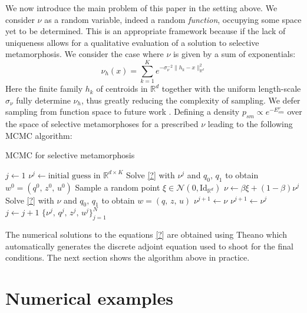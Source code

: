 \documentclass[runningheads]{llncs}
\newcommand{\Rd}{\mathbb{R}^{d}}
\newcommand{\RdK}{\mathbb{R}^{d\times K}}
\begin{document}
We now introduce the main problem of this paper in the setting above. We
consider $\nu$ as a random variable, indeed a random \emph{function}, occupying
some space yet to be determined. This is an appropriate framework because if the
lack of uniqueness allows for a qualitative evaluation of a solution to
selective metamorphosis. We consider the case where $\nu$ is given by a sum of
exponentials:
\begin{equation}
    \nu_h (x) = \sum_{k=1}^K e^{ -\sigma_\nu^{-2}\|h_k - x\|_{\Rd}^2}
\end{equation}
Here the finite family $h_k$ of centroids in $\Rd$ together with the uniform
length-scale $\sigma_\nu$ fully determine $\nu_h$, thus greatly reducing the
complexity of sampling. We defer sampling from function space to future work
\cite{.}. Defining a density $p_{sm} \propto e^{- E_{sm}^\nu}$ over the space of
selective metamorphoses for a prescribed $\nu$ leading to the following MCMC
algorithm:

\newcommand{\mhsample}{\textsc{sampleCentroid}}
\newcommand{\acceptprob}{\textsc{accept}}
\begin{algorithm}[h!]
\begin{algorithmic}
\caption{MCMC for selective metamorphosis}\label{algo:mcmc}
\Procedure{mcmcSM}{$N$, $K$, $q_0$, $q_1$, $\beta\in (0,1]$}
\State $j \gets 1$
\State $\nu^j \gets \text{initial guess in } \RdK$
\State Solve \eqref{?} with $\nu^j$ and $q_0,\,q_1$ to obtain $w^0 = (q^0,\, z^0,\, u^0)$
\State Sample a random point $\xi \in \mathcal N(0, \text{Id}_{\mathbb R^d})$
\State $\nu \gets \beta \xi + (1-\beta) \nu^j$
\State Solve \eqref{?} with $\nu$ and $q_0,\,q_1$ to obtain $w = (q,\, z,\, u)$
    \State $\nu^{j+1} \gets \nu$
\Else
    \State $\nu^{j+1} \gets \nu^j$
\EndIf
\State $j\gets j+1$
\EndWhile
\Return $\{\nu^j,\, q^j,\, z^j,\, u^j\}_{j=1}^N$
\EndProcedure
\end{algorithmic}
\end{algorithm}

The numerical solutions to the equations \eqref{?} are obtained using Theano
\cite{team2016theano} which automatically generates the discrete adjoint
equation used to shoot for the final conditions. The next section shows the
algorithm above in practice.

\section{Numerical examples}\label{sec:numerical}
\end{document}
